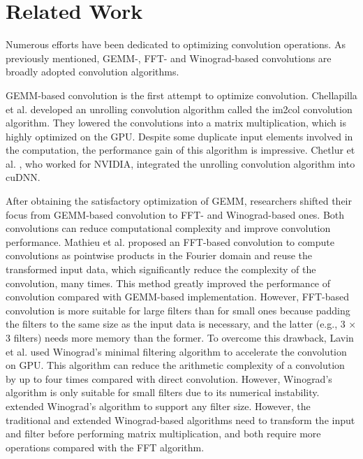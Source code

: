 \section{Related Work}
Numerous efforts have been dedicated to optimizing convolution operations. As previously mentioned, GEMM-, FFT- and
Winograd-based convolutions are broadly adopted convolution algorithms.

GEMM-based convolution is the first attempt to optimize convolution. Chellapilla et al. \cite{Chellapilla2006High} developed an unrolling
convolution algorithm  called the im2col convolution algorithm. They lowered the convolutions into a matrix multiplication, which is
highly optimized on the GPU. Despite some duplicate input elements involved in the computation, the performance gain of this algorithm is impressive. Chetlur et al. \cite{ChetlurWVCTCS14}, who worked for NVIDIA, integrated the unrolling convolution algorithm into cuDNN.

After obtaining the satisfactory optimization of GEMM, researchers shifted their focus from GEMM-based convolution to FFT- and
Winograd-based ones. Both convolutions can reduce computational complexity and improve convolution performance. Mathieu et al.
\cite{mathieu2013fast} proposed an FFT-based convolution to compute convolutions as pointwise products in the Fourier domain and reuse the
transformed input data, which significantly reduce the complexity of the convolution, many times. This method greatly improved the
performance of convolution compared with GEMM-based implementation. However, FFT-based convolution is more suitable for large filters than
for small ones because padding the filters to the same size as the input data is necessary, and  the latter (e.g., 3 × 3 filters) needs
more memory than the former. To overcome this drawback, Lavin et al. \cite{lavin2016fast} used Winograd's minimal filtering algorithm to
accelerate the convolution on GPU. This algorithm can reduce the arithmetic complexity of a convolution by up to four times compared with
direct convolution. However, Winograd's algorithm is only suitable for small filters due to its numerical instability.
\cite{Zhen2018Optimizing} extended Winograd's algorithm to support any filter size. However, the traditional and extended Winograd-based
algorithms need to transform the input and filter before performing matrix multiplication, and both require more operations compared with
the FFT algorithm.

